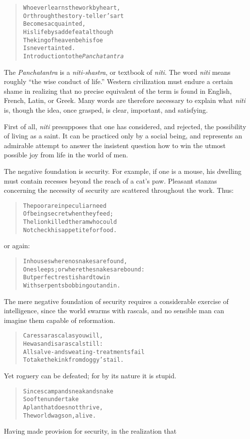 \documentclass[article, twoside, 14pt]{memoir}
\renewenvironment{verbatim}{%
\begin{quote}%
\vskip -10pt%
\begin{alltt}\normalfont\large}{\end{alltt}%
\end{quote}%
\vskip -10pt
} %
\begin{document}
\begin{verbatim}
Whoever learns the work by heart,
Or through the story-teller's art
    Becomes acquainted,
His life by sad defeat{\textemdash}although
The king of heaven be his foe{\textemdash}
    Is never tainted.
        {\textemdash}Introduction to the \emph{Panchatantra}
\end{verbatim}
The \emph{Panchatantra} is a \emph{niti-shastra}, or textbook of
\emph{niti}. The word \emph{niti} means roughly
``the wise conduct of life.'' Western civilization must endure a
certain shame in realizing that no precise equivalent of the term
is found in English, French, Latin, or Greek. Many words are
therefore necessary to explain what \emph{niti} is, though the
idea, once grasped, is clear, important, and satisfying.

First of all, \emph{niti} presupposes that one has considered, and
rejected, the possibility of living as a saint. It can be practiced
only by a social being, and represents an admirable attempt to
answer the insistent question how to win the utmost possible joy
from life in the world of men.

The negative foundation is security. For example, if one is a
mouse, his dwelling must contain recesses beyond the reach of a
cat's paw. Pleasant stanzas concerning the necessity of security
are scattered throughout the work. Thus:

\begin{verbatim}
The poor are in peculiar need
Of being secret when they feed;
The lion killed the ram who could
Not check his appetite for food.
\end{verbatim}
or again:

\begin{verbatim}
In houses where no snakes are found,
One sleeps; or where the snakes are bound:
But perfect rest is hard to win
With serpents bobbing out and in.
\end{verbatim}
The mere negative foundation of security requires a considerable
exercise of intelligence, since the world swarms with rascals, and
no sensible man can imagine them capable of reformation.

\begin{verbatim}
Caress a rascal as you will,
He was and is a rascal still:
All salve- and sweating-treatments fail
To take the kink from doggy's tail.
\end{verbatim}
Yet roguery can be defeated; for by its nature it is stupid.

\begin{verbatim}
Since scamp and sneak and snake
So often undertake
A plan that does not thrive,
The world wags on, alive.
\end{verbatim}
Having made provision for security, in the realization that
\end{document}
